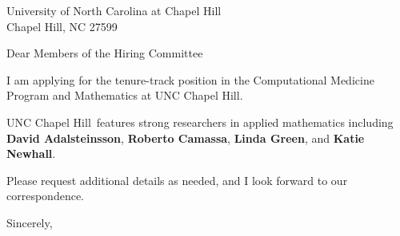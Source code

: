 




	
	
	\def\School{UNC Chapel Hill}
	
	\begin{letter}
		{University of North Carolina at Chapel Hill\\
			Chapel Hill, NC 27599
		}
		
		\opening{Dear Members of the Hiring Committee}
		
		
		I am applying for the tenure-track position in the Computational Medicine Program and Mathematics at \School. 
		
		\School~features strong researchers in applied mathematics including \textbf{David Adalsteinsson}, \textbf{Roberto Camassa}, \textbf{Linda Green}, and \textbf{Katie Newhall}. 
		
		
		
		
		
		Please request additional details as needed, and I look forward to our correspondence.
		
		\closing{Sincerely,}
	\end{letter}
